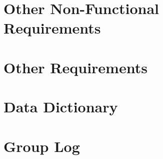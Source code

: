 \documentclass{scrreprt}
\begin{document}
\chapter{Other Non-Functional Requirements}

\chapter{Other Requirements}

\begin{appendices}
\chapter{Data Dictionary}

\chapter{Group Log}
\end{appendices}
\end{document}
